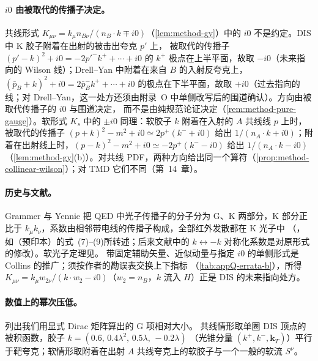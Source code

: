 \paragraph{$i0$ 由被取代的传播子决定。}共线形式 $K_{\mu\nu}=k_\mu n_{B\nu}/(n_B\cdot k\mp i0)$（\cref{lem:method-gy}）中的 $i0$ 不是约定。DIS 中 K 胶子附着在出射的被击出夸克 $p'$ 上，
被取代的传播子 $(p'-k)^2+i0=-2p'^-k^++\cdots+i0$ 的 $k^+$ 极点在上半平面，故取 $-i0$（未来指向的 Wilson 线）；Drell--Yan 中附着在来自 $B$ 的入射反夸克上，
$(\bar p_B+k)^2+i0=2\bar p_B^-k^++\cdots+i0$ 的极点在下半平面，故取 $+i0$（过去指向的线；对 Drell--Yan，这一处方还须由附录~O 中单侧改写后的围道确认）。方向由被取代传播子的 $i0$ 与围道决定，
而不是由纯规范论证决定（\cref{rem:method-pure-gauge}）。软形式 $K_s$ 中的 $\pm i0$ 同理：软胶子 $k$ 附着在入射的 $A$ 共线线 $p$ 上时，被取代的传播子 $(p+k)^2-m^2+i0\simeq2p^+(k^-+i0)$ 给出 $1/(n_A\cdot k+i0)$；附着在出射线上时，$(p-k)^2-m^2+i0\simeq-2p^+(k^--i0)$ 给出 $1/(n_A\cdot k-i0)$（\cref{lem:method-gy}(b)）。对共线 PDF，两种方向给出同一个算符（\cref{prop:method-collinear-wilson}）；对 TMD 它们不同（第~14~章）。

\paragraph{历史与文献。}Grammer 与 Yennie 把 QED 中光子传播子的分子分为 G、K 两部分，K 部分正比于 $k_\mu k_\nu$，系数由相邻带电线的传播子构成，全部红外发散都在 K 光子中
（\cite{GrammerYennie1973}，如\cite{SenIndumathiChoudhury2019}（预印本）的式~(7)--(9)所转述；后来文献中的 $k\leftrightarrow-k$ 对称化系数是对原形式的修改）。软光子定理见\cite{Weinberg1965}。
带固定辅助矢量、近似动量与指定 $i0$ 的单侧形式是 Collins 的推广\cite[第~5.5.6、10.6、11.9.3~节]{Collins2011}；\cite[式~(11.4)--(11.6)]{Collins2011}须按作者的勘误表交换上下指标
（\cref{tab:appQ-errata-b}），所得 $K_{\mu\nu}=k_\mu w_{2\nu}/(k\cdot w_2-i0)$（$w_2=n_B$，$k$ 流入 $H$）正是 DIS 的未来指向处方。

\paragraph{数值上的幂次压低。}列出我们用显式 Dirac 矩阵算出的 G 项相对大小。%
共线情形取单圈 DIS 顶点的被积函数，胶子 $k=(0.6,\,0.4\lambda^2,\,0.5\lambda,\,-0.2\lambda)$
（光锥分量 $(k^+,k^-,\mathbf k_T)$）平行于靶夸克；软情形取附着在出射 $A$ 共线夸克上的软胶子与一个一般的软流 $S^\nu$。

